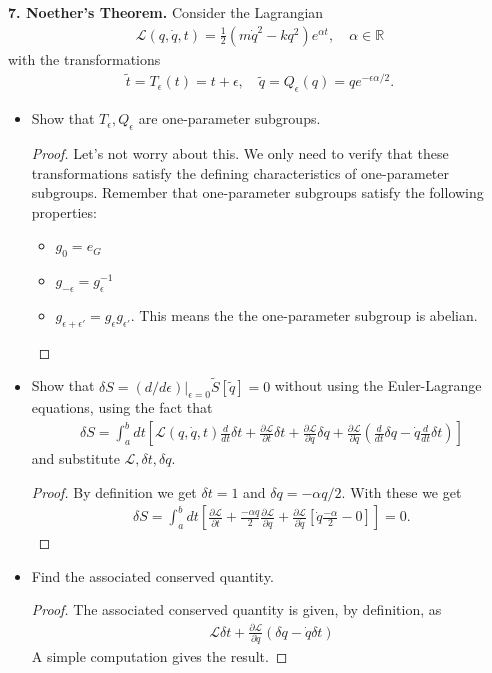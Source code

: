 \documentclass{book}
\theoremstyle{definition}
\newcommand{\p}{\partial}
\newcommand{\R}{\mathbb{R}}
\newcommand{\lag}{\mathcal{L}}
\newcommand{\al}{\alpha}
\newcommand{\ep}{\epsilon}
\newcommand{\f}[2]{\frac{#1}{#2}}
\newcommand{\td}[1]{\tilde{#1}}
\newcommand{\lp}{\left(}
\newcommand{\rp}{\right)}
\newcommand{\lb}{\left[}
\newcommand{\rb}{\right]}
\begin{document}
\noindent \textbf{7. Noether's Theorem.}  Consider the Lagrangian
\begin{align}
\lag(q,\dot{q},t) = \f{1}{2}\lp m\dot{q}^2 - kq^2 \rp e^{\al t}, \quad \al \in \R
\end{align}
with the transformations
\begin{align}
\td{t} = T_\ep(t) = t+\ep, \quad \td{q} = Q_\ep(q) = qe^{-\ep\al/2}.
\end{align}

\begin{itemize}
	\item Show that $T_\ep, Q_\ep$ are one-parameter subgroups. 
	\begin{proof}
		Let's not worry about this. We only need to verify that these transformations satisfy the defining characteristics of one-parameter subgroups. Remember that one-parameter subgroups satisfy the following properties:
		\begin{itemize}
			\item $g_0 = e_G$
			\item $g_{-\epsilon} = g_\epsilon^{-1}$
			\item $g_{\epsilon + \epsilon'} = g_\epsilon g_{\epsilon'}$. This means the the one-parameter subgroup is abelian.
		\end{itemize}
	\end{proof}

	\item Show that $\delta S = (d/d\ep)\big\vert_{\ep=0}\td{S}[\td{q}] = 0$ without using the Euler-Lagrange equations, using the fact that
	\begin{align}
	\delta S = \int^b_a dt\lb \lag(q,\dot{q},t)\f{d}{dt}\delta t + \f{\p \lag}{\p t}\delta t + \f{\p \lag}{\p q}\delta q + \f{\p \lag}{\p \dot{q}}\lp \f{d}{dt}\delta q - \dot{q}\f{d}{dt}\delta t\rp \rb
	\end{align}
	and substitute $\lag, \delta t, \delta q$.
	\begin{proof}
	By definition we get $\delta t=  1$ and $\delta q = -\al q/2$. With these we get 
	\begin{align}
	\delta S = \int^b_a dt\lb \f{\p \lag}{\p t} + \f{-\al q}{2} \f{\p \lag}{\p q} + \f{\p \lag}{\p \dot{q}}\lb \dot{q}\f{-\al}{2} - 0 \rb \rb = 0.
	\end{align}
	\end{proof}

	\item Find the associated conserved quantity.
	\begin{proof}
	The associated conserved quantity is given, by definition, as
	\begin{align}
	\lag \delta t + \f{\p \lag}{\p \dot{q}}(\delta q - \dot{q}\delta t)
	\end{align}
	A simple computation gives the result. 
	\end{proof}


\end{itemize}
\end{document}
